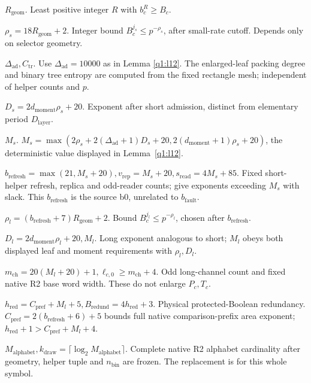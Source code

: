 \noindent\textbf{\(R_{\mathrm{geom}}\)}. Least positive integer \(R\) with \(b_{c}^{R}\ge B_{c}\).\par\smallskip
\noindent\textbf{\(\rho_{s}=18R_{\mathrm{geom}}+2\)}. Integer bound \(B_{c}^{j_{s}}\le p^{-\rho_{s}}\), after small-rate cutoff. Depends only on selector geometry.\par\smallskip
\noindent\textbf{\(\Delta_{\mathrm{ad}},C_{\mathrm{tr}}\)}. Use \(\Delta_{\mathrm{ad}}=10000\) as in Lemma \ref{q1:l12}. The enlarged-leaf packing degree and binary tree entropy are computed from the fixed rectangle mesh; independent of helper counts and \(p\).\par\smallskip
\noindent\textbf{\(D_{s}=2d_{\mathrm{moment}} \rho_{s}+20\)}. Exponent after short admission, distinct from elementary period \(D_{\mathrm{layer}}\).\par\smallskip
\noindent\textbf{\(M_{s}\)}. \(M_{s}=\max (2\rho_{s}+2(\Delta_{\mathrm{ad}}+1)D_{s}+20,2(d_{\mathrm{moment}}+1)\rho_{s}+20)\), the deterministic value displayed in Lemma~\ref{q1:l12}.\par\smallskip
\noindent\textbf{\(b_{\mathrm{refresh}}=\max (21,M_{s}+20),v_{\mathrm{rep}}=M_{s}+20,s_{\mathrm{read}}=4M_{s}+85\)}. Fixed short-helper refresh, replica and odd-reader counts; give exponents exceeding \(M_{s}\) with slack. This \(b_{\mathrm{refresh}}\) is the source b0, unrelated to \(b_{\mathrm{fault}}\).\par\smallskip
\noindent\textbf{\(\rho_{l}=(b_{\mathrm{refresh}}+7)R_{\mathrm{geom}}+2\)}. Bound \(B_{c}^{j_{l}}\le p^{-\rho_{l}}\), chosen after \(b_{\mathrm{refresh}}\).\par\smallskip
\noindent\textbf{\(D_{l}=2d_{\mathrm{moment}} \rho_{l}+20, M_{l}\)}. Long exponent analogous to short; \(M_{l}\) obeys both displayed leaf and moment requirements with \(\rho_{l},D_{l}\).\par\smallskip
\noindent\textbf{\(m_{\mathrm{ch}}=20(M_{l}+20)+1,\ell_{c,0}\ge m_{\mathrm{ch}}+4\)}. Odd long-channel count and fixed native R2 base word width. These do not enlarge \(P_{c},T_{c}\).\par\smallskip
\noindent\textbf{\(h_{\mathrm{red}}=C_{\mathrm{pref}}+M_{l}+5, B_{\mathrm{redund}}=4h_{\mathrm{red}}+3\)}. Physical protected-Boolean redundancy. \(C_{\mathrm{pref}}=2(b_{\mathrm{refresh}}+6)+5\) bounds full native comparison-prefix area exponent; \(h_{\mathrm{red}}+1>C_{\mathrm{pref}}+M_{l}+4\).\par\smallskip
\noindent\textbf{\(M_{\mathrm{alphabet}},k_{\mathrm{draw}}=\lceil \log _{2} M_{\mathrm{alphabet}}\rceil\)}. Complete native R2 alphabet cardinality after geometry, helper tuple and \(n_{\mathrm{bin}}\) are frozen. The replacement is for this whole symbol.\par\smallskip
